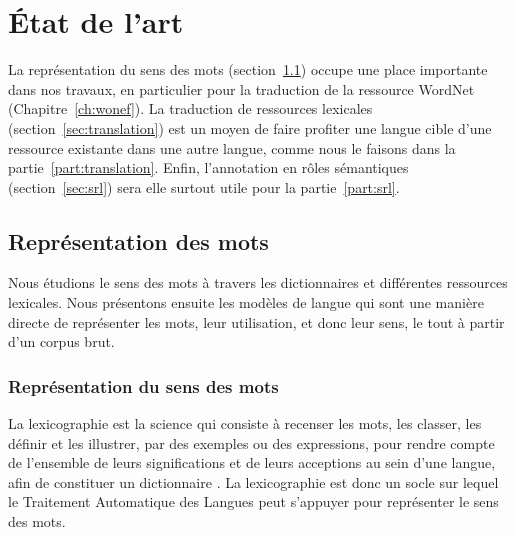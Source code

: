 

\chapter{État de l'art} 
\label{ch:etatdelart} 


La représentation du sens des mots (section~\ref{sec:mots}) occupe une place
importante dans nos travaux, en particulier pour la traduction de la ressource
WordNet (Chapitre~\ref{ch:wonef}). La traduction de ressources lexicales
(section~\ref{sec:translation}) est un moyen de faire profiter une langue cible
d'une ressource existante dans une autre langue, comme nous le faisons dans la
partie~\ref{part:translation}. Enfin, l'annotation en rôles sémantiques
(section~\ref{sec:srl}) sera elle surtout utile pour la partie~\ref{part:srl}.

\section{Représentation des mots}
\label{sec:mots}

Nous étudions le sens des mots à travers les dictionnaires et différentes
ressources lexicales. Nous présentons ensuite les modèles de langue qui sont
une manière directe de représenter les mots, leur utilisation, et donc leur
sens, le tout à partir d'un corpus brut.

\subsection{Représentation du sens des mots}
\label{subsec:sens_mots}

La lexicographie est la science qui consiste à recenser les mots, les classer,
les définir et les illustrer, par des exemples ou des expressions, pour rendre
compte de l'ensemble de leurs significations et de leurs acceptions au sein
d'une langue, afin de constituer un dictionnaire
\citep{wikipedia2014lexicographie}. La lexicographie est donc un socle sur
lequel le Traitement Automatique des Langues peut s'appuyer pour représenter le
sens des mots.

